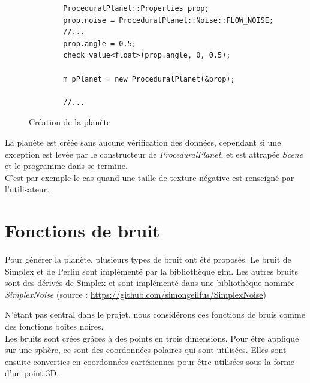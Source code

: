   \begin{figure}
    \centering
      \lstset{language=C++}
      \begin{lstlisting}
        ProceduralPlanet::Properties prop;
        prop.noise = ProceduralPlanet::Noise::FLOW_NOISE;
        //...
        prop.angle = 0.5;
        check_value<float>(prop.angle, 0, 0.5);
        
        m_pPlanet = new ProceduralPlanet(&prop);
            
        //...
      \end{lstlisting}    
      \caption{Création de la planète}
      \label{fig:code_scene}
  \end{figure}
  
  
  La planète est créée sans aucune vérification des données, cependant si une exception est levée par le constructeur de \textit{ProceduralPlanet}, et est attrapée \textit{Scene} et le programme dans se termine.\\
  C'est par exemple le cas quand une taille de texture négative est renseigné par l'utilisateur.
  
  \section{Fonctions de bruit}
  
  Pour générer la planète, plusieurs types de bruit ont été proposés. Le bruit de Simplex et de Perlin sont implémenté par la bibliothèque glm. Les autres bruits sont des dérivés de Simplex et sont implémenté dans une bibliothèque nommée \textit{SimplexNoise} (source : \url{https://github.com/simongeilfus/SimplexNoise})
  
  N'étant pas central dans le projet, nous considérons ces fonctions de bruis comme des fonctions boîtes noires.\\
  Les bruits sont crées grâces à des points en trois dimensions. Pour être appliqué sur une sphère, ce sont des coordonnées polaires qui sont utilisées. Elles sont ensuite converties en coordonnées cartésiennes pour être utilisées sous la forme d'un point 3D.\\

  
